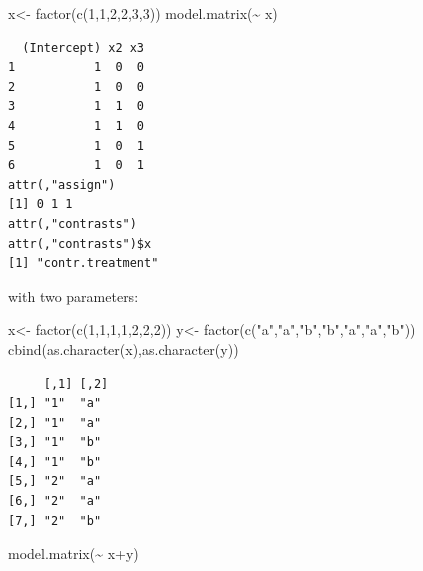 \documentclass[
  letterpaper,
  DIV=11,
  numbers=noendperiod]{scrartcl}
\newenvironment{Shaded}{\begin{snugshade}}{\end{snugshade}}
\newcommand{\DecValTok}[1]{\textcolor[rgb]{0.68,0.00,0.00}{#1}}
\newcommand{\FunctionTok}[1]{\textcolor[rgb]{0.28,0.35,0.67}{#1}}
\newcommand{\NormalTok}[1]{\textcolor[rgb]{0.00,0.23,0.31}{#1}}
\newcommand{\OtherTok}[1]{\textcolor[rgb]{0.00,0.23,0.31}{#1}}
\newcommand{\SpecialCharTok}[1]{\textcolor[rgb]{0.37,0.37,0.37}{#1}}
\newcommand{\StringTok}[1]{\textcolor[rgb]{0.13,0.47,0.30}{#1}}
\begin{document}
\begin{Shaded}
\begin{Highlighting}[]
\NormalTok{x}\OtherTok{\textless{}{-}} \FunctionTok{factor}\NormalTok{(}\FunctionTok{c}\NormalTok{(}\DecValTok{1}\NormalTok{,}\DecValTok{1}\NormalTok{,}\DecValTok{2}\NormalTok{,}\DecValTok{2}\NormalTok{,}\DecValTok{3}\NormalTok{,}\DecValTok{3}\NormalTok{))}
\FunctionTok{model.matrix}\NormalTok{(}\SpecialCharTok{\textasciitilde{}}\NormalTok{ x)}
\end{Highlighting}
\end{Shaded}

\begin{verbatim}
  (Intercept) x2 x3
1           1  0  0
2           1  0  0
3           1  1  0
4           1  1  0
5           1  0  1
6           1  0  1
attr(,"assign")
[1] 0 1 1
attr(,"contrasts")
attr(,"contrasts")$x
[1] "contr.treatment"
\end{verbatim}

with two parameters:

\begin{Shaded}
\begin{Highlighting}[]
\NormalTok{x}\OtherTok{\textless{}{-}} \FunctionTok{factor}\NormalTok{(}\FunctionTok{c}\NormalTok{(}\DecValTok{1}\NormalTok{,}\DecValTok{1}\NormalTok{,}\DecValTok{1}\NormalTok{,}\DecValTok{1}\NormalTok{,}\DecValTok{2}\NormalTok{,}\DecValTok{2}\NormalTok{,}\DecValTok{2}\NormalTok{))}
\NormalTok{y}\OtherTok{\textless{}{-}} \FunctionTok{factor}\NormalTok{(}\FunctionTok{c}\NormalTok{(}\StringTok{"a"}\NormalTok{,}\StringTok{"a"}\NormalTok{,}\StringTok{"b"}\NormalTok{,}\StringTok{"b"}\NormalTok{,}\StringTok{"a"}\NormalTok{,}\StringTok{"a"}\NormalTok{,}\StringTok{"b"}\NormalTok{))}
\FunctionTok{cbind}\NormalTok{(}\FunctionTok{as.character}\NormalTok{(x),}\FunctionTok{as.character}\NormalTok{(y))}
\end{Highlighting}
\end{Shaded}

\begin{verbatim}
     [,1] [,2]
[1,] "1"  "a" 
[2,] "1"  "a" 
[3,] "1"  "b" 
[4,] "1"  "b" 
[5,] "2"  "a" 
[6,] "2"  "a" 
[7,] "2"  "b" 
\end{verbatim}

\begin{Shaded}
\begin{Highlighting}[]
\FunctionTok{model.matrix}\NormalTok{(}\SpecialCharTok{\textasciitilde{}}\NormalTok{ x}\SpecialCharTok{+}\NormalTok{y)}
\end{Highlighting}
\end{Shaded}
\end{document}
